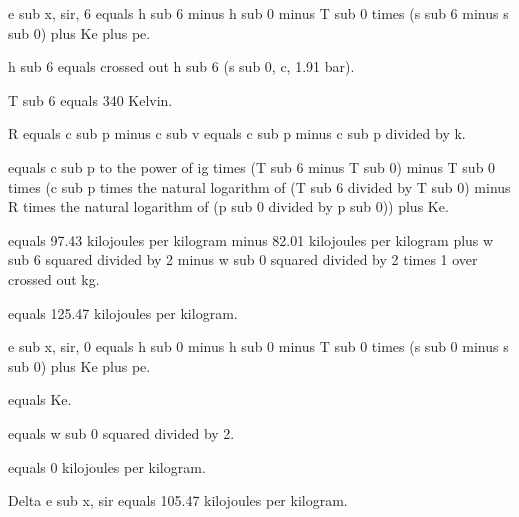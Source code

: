 e sub x, sir, 6 equals h sub 6 minus h sub 0 minus T sub 0 times (s sub 6 minus s sub 0) plus Ke plus pe.

h sub 6 equals crossed out h sub 6 (s sub 0, c, 1.91 bar).

T sub 6 equals 340 Kelvin.

R equals c sub p minus c sub v equals c sub p minus c sub p divided by k.

equals c sub p to the power of ig times (T sub 6 minus T sub 0) minus T sub 0 times (c sub p times the natural logarithm of (T sub 6 divided by T sub 0) minus R times the natural logarithm of (p sub 0 divided by p sub 0)) plus Ke.

equals 97.43 kilojoules per kilogram minus 82.01 kilojoules per kilogram plus w sub 6 squared divided by 2 minus w sub 0 squared divided by 2 times 1 over crossed out kg.

equals 125.47 kilojoules per kilogram.

e sub x, sir, 0 equals h sub 0 minus h sub 0 minus T sub 0 times (s sub 0 minus s sub 0) plus Ke plus pe.

equals Ke.

equals w sub 0 squared divided by 2.

equals 0 kilojoules per kilogram.

Delta e sub x, sir equals 105.47 kilojoules per kilogram.